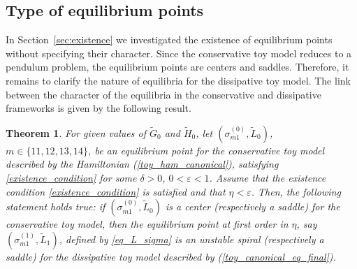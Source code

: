 \documentclass[12pt,reqno]{amsart}
\numberwithin{equation}{section}
\newtheorem{theorem}{Theorem}%
\newcommand\equ[1]{{\rm (\ref{#1})}}
\begin{document}
\subsection{Type of equilibrium points} \label{sec:type}

In Section~\ref{sec:existence} we investigated the existence of equilibrium points without
specifying their character. Since the conservative toy model reduces to a pendulum problem,
the equilibrium points are centers and saddles.  Therefore, it remains to clarify the nature
of equilibria for the dissipative toy model. The link between the character of the equilibria
in the conservative and dissipative frameworks is given by the following result.

\begin{theorem}\label{Theorem:type}
For given values of $\widetilde{G}_0$ and $\widetilde{H}_0$, let $(\sigma_{m1}^{(0)}, \widetilde{L}_0)$, $m\in \{11,12,13,14\}$,
be an equilibrium point for the conservative toy model described by the Hamiltonian \equ{toy_ham_canonical},
satisfying \eqref{existence_condition} for some $\delta>0$, $0<\varepsilon<1$. Assume that the existence condition \eqref{existence_condition} is satisfied and
that $\eta<\varepsilon$.
Then, the following statement holds true:
if $(\sigma_{m1}^{(0)}, \widetilde{L}_0)$ is a center (respectively a saddle) for the conservative toy model,
then the equilibrium point at first order in $\eta$,
say $(\sigma_{m1}^{(1)}, \widetilde{L}_1)$, defined by \eqref{eq_L_sigma} is an unstable spiral (respectively
a saddle) for the dissipative toy model described by \equ{toy_canonical_eq_final}.
\end{theorem}
\end{document}
